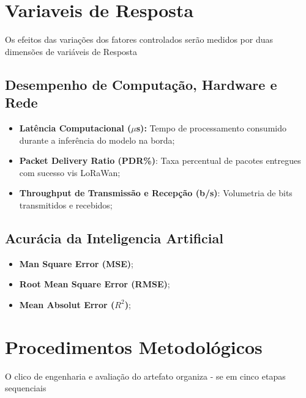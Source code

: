 \section{Variaveis de Resposta}

Os efeitos das variações dos fatores controlados serão medidos por duas dimensões de variáveis de Resposta

\subsection{Desempenho de Computação, Hardware e Rede}
\begin{itemize}
    \item \textbf{Latência Computacional ($\mu$s):} Tempo de processamento consumido durante a inferência
                                                    do modelo na borda;
    \item  \textbf{Packet Delivery Ratio (PDR\%)}: Taxa percentual de pacotes entregues com sucesso vis LoRaWan;
    \item  \textbf{Throughput de Transmissão e Recepção (b/s)}: Volumetria de bits transmitidos e recebidos;
\end{itemize}

\subsection{Acurácia da Inteligencia Artificial}

\begin{itemize}
    \item \textbf{Man Square Error (MSE)};
    \item \textbf{Root Mean Square Error (RMSE)};
    \item \textbf{Mean Absolut Error ($R^2$)};
\end{itemize}

\section{Procedimentos Metodológicos}

O clico de engenharia e avaliação do artefato organiza - se em cinco etapas sequenciais

